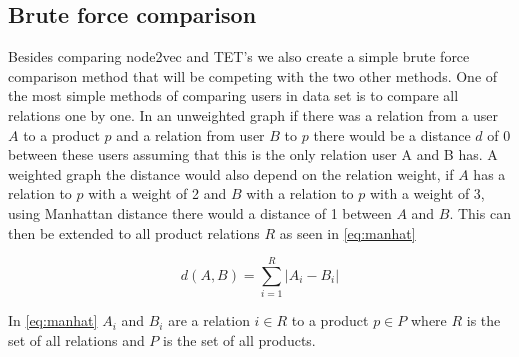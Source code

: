 \subsection{Brute force comparison}\label{Subsec:brute_force}
Besides comparing node2vec and TET's we also create a simple brute force comparison method that will be competing with the two other methods.
One of the most simple methods of comparing users in data set is to compare all relations one by one. 
In an unweighted graph if there was a relation from a user $A$ to a product $p$ and a relation from user $B$ to $p$ there would be a distance $d$ of 0 between these users assuming that this is the only relation user A and B has.
A weighted graph the distance would also depend on the relation weight, if $A$ has a relation to $p$ with a weight of 2 and $B$ with a relation to $p$ with a weight of 3, using Manhattan distance there would a distance of 1 between $A$ and $B$. 
This can then be extended to all product relations $R$ as seen in \autoref{eq:manhat}

\begin{equation}\label{eq:manhat}
	d(A,B) = \sum_{i=1}^{R} |A_i - B_i|
\end{equation}

In \autoref{eq:manhat} $A_i$ and $B_i$ are a relation $i \in R$ to a product $p \in P$ where $R$ is the set of all relations and $P$ is the set of all products.
